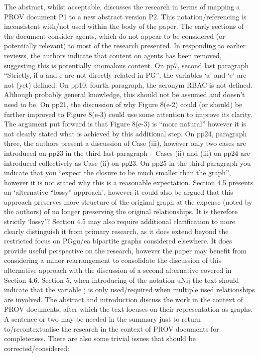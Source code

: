 \documentclass{article}
\begin{document}
The abstract, whilst acceptable, discusses the research in terms of mapping a PROV document P1 to a new abstract version P2.  This notation/referencing is inconsistent with/not used within the body of the paper.
The early sections of the document consider agents, which do not appear to be considered (or potentially relevant) to most of the research presented.  In responding to earlier reviews, the authors indicate that content on agents has been removed, suggesting this is potentially anomalous content.
On pp7, second last paragraph “Strictly, if a and e are not directly related in PG”, the variables ‘a’ and ‘e’ are not (yet) defined.
On pp10, fourth paragraph, the acronym RBAC is not defined.  Although probably general knowledge, this should not be assumed and doesn’t need to be.
On pp21, the discussion of why Figure 8(e-2) could (or should) be further improved to Figure 8(e-3) could use some attention to improve its clarity.  The argument put forward is that Figure 8(e-3) is “more natural” however it is not clearly stated what is achieved by this additional step.
On pp24, paragraph three, the authors present a discussion of Case (iii), however only two cases are introduced on pp23 in the third last paragraph – Cases (ii) and (iii) on pp24 are introduced collectively as Case (ii) on pp23.
On pp25 in the third paragraph you indicate that you “expect the closure to be much smaller than the graph”, however it is not stated why this is a reasonable expectation.
Section 4.5 presents an ‘alternative “lossy” approach’, however it could also be argued that this approach preserves more structure of the original graph at the expense (noted by the authors) of no longer preserving the original relationships.  It is therefore strictly ‘lossy’?  Section 4.5 may also require additional clarification to more clearly distinguish it from primary research, as it does extend beyond the restricted focus on PGgu/ea bipartite graphs considered elsewhere.  It does provide useful perspective on the research, however the paper may benefit from considering a minor rearrangement to consolidate the discussion of this alternative approach with the discussion of a second alternative covered in Section 4.6.
Section 5, when introducing of the notation uNij the text should indicate that the variable j is only used/required when multiple used relationships are involved.
The abstract and introduction discuss the work in the context of PROV documents, after which the text focuses on their representation as graphs.  A sentence or two may be needed in the summary just to return to/recontextualise the research in the context of PROV documents for completeness.
There are also some trivial issues that should be corrected/considered:
\end{document}
